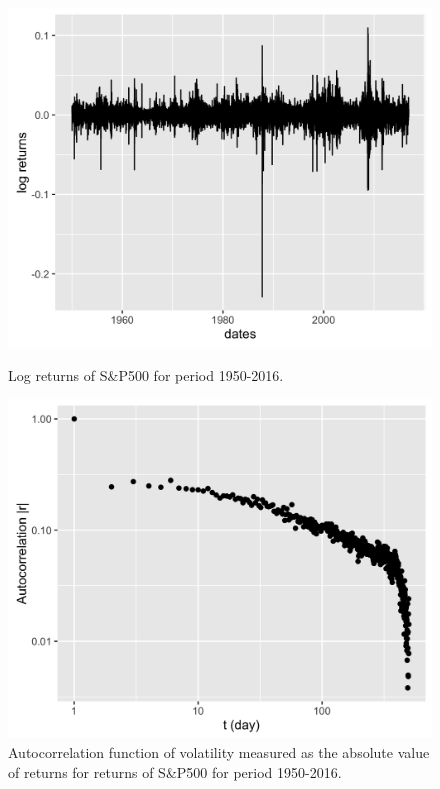 \documentclass[letterpaper,12pt]{article}
\begin{document}
\begin{figure}[!tbp]
  \centering
  \begin{minipage}[t]{0.45\textwidth}
    \includegraphics[width=\textwidth]{fig3.png}
    \caption{Log returns of S\&P500 for period 1950-2016.\label{fig:fig3}}
  \end{minipage}
  \hfill
  \begin{minipage}[t]{0.45\textwidth}
    \includegraphics[width=\textwidth]{fig4.png}
    \caption{Autocorrelation function of volatility measured as the absolute value of returns for returns of S\&P500 for period 1950-2016.\label{fig:fig4}}
  \end{minipage}
\end{figure}
\end{document}
